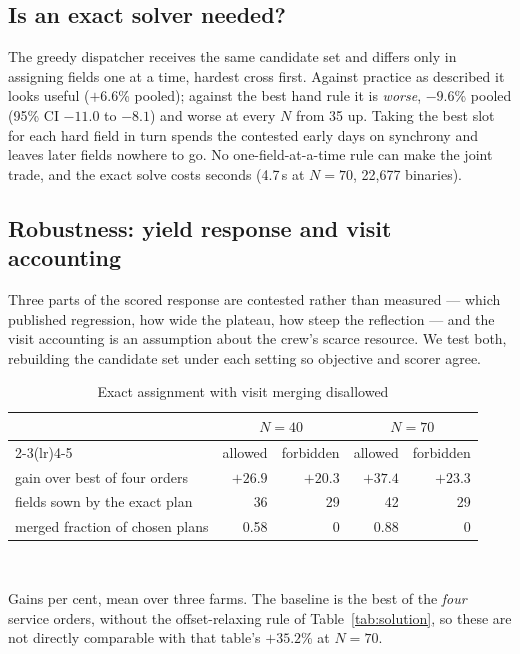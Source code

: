 \documentclass[10pt,twocolumn]{article}
\begin{document}
\subsection{Is an exact solver needed?}

The greedy dispatcher receives the same candidate set and differs only in
assigning fields one at a time, hardest cross first. Against practice as
described it looks useful ($+6.6$\% pooled); against the best hand rule it
is \emph{worse}, $-9.6$\% pooled (95\% CI $-11.0$ to $-8.1$) and worse at
every $N$ from 35 up. Taking the best slot for each hard field in turn
spends the contested early days on synchrony and leaves later fields nowhere
to go. No one-field-at-a-time rule can make the joint trade, and the exact
solve costs seconds (4.7\,s at $N = 70$, 22{,}677 binaries).

\subsection{Robustness: yield response and visit accounting}

Three parts of the scored response are contested rather than measured ---
which published regression, how wide the plateau, how steep the reflection
--- and the visit accounting is an assumption about the crew's scarce
resource. We test both, rebuilding the candidate set under each setting so
objective and scorer agree.

\begin{table}[t]
\caption{Exact assignment with visit merging disallowed}
\label{tab:robust}
\centering
\footnotesize
\setlength{\tabcolsep}{3.4pt}
\begin{tabular}{@{}lrrrr@{}}
\hline
 & \multicolumn{2}{c}{$N = 40$} & \multicolumn{2}{c}{$N = 70$} \\
\cmidrule(lr){2-3}\cmidrule(lr){4-5}
 & allowed & forbidden & allowed & forbidden \\
\hline
gain over best of four orders & $+26.9$ & $+20.3$ & $+37.4$ & $+23.3$ \\
fields sown by the exact plan & 36 & 29 & 42 & 29 \\
merged fraction of chosen plans & 0.58 & 0 & 0.88 & 0 \\
\hline
\end{tabular}
\\[2pt]
\footnotesize\raggedright Gains per cent, mean over three farms. The
baseline is the best of the \emph{four} service orders, without the
offset-relaxing rule of Table~\ref{tab:solution}, so these are not directly
comparable with that table's $+35.2$\% at $N = 70$.
\end{table}
\end{document}

